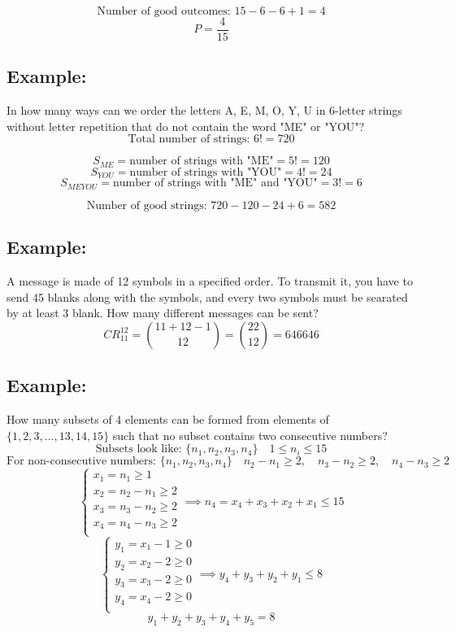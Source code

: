 \documentclass[11pt]{article}
\begin{document}
\[
\text{Number of good outcomes: } 15 - 6 - 6 + 1 = 4
\]
\[
P = \frac{4}{15}
\]

\subsection*{Example:}
In how many ways can we order the letters A, E, M, O, Y, U in 6-letter strings without letter repetition that do not contain the word "ME" or "YOU"?
\[
\text{Total number of strings: } 6! = 720
\]

\[
S_{ME} = \text{number of strings with "ME"} = 5! = 120
\]
\[
S_{YOU} = \text{number of strings with "YOU"} = 4! = 24
\]
\[
S_{MEYOU} = \text{number of strings with "ME" and "YOU"} = 3! = 6
\]

\[
\text{Number of good strings: } 720 - 120 - 24 + 6 = 582
\]

\subsection*{Example:}
A message is made of 12 symbols in a specified order. To transmit it, you have to send 45 blanks along with the symbols, and every two symbols must be searated by at least 3 blank. How many different messages can be sent?
\[
CR_{11}^{12} = \binom{11 + 12 - 1}{12} = \binom{22}{12} = 646646
\]

\subsection*{Example:}
How many subsets of 4 elements can be formed from elements of $\{1, 2, 3, \dots, 13, 14, 15\}$ such that no subset contains two consecutive numbers?
\[
\text{Subsets look like: } \{n_1, n_2, n_3, n_4\} \quad 1 \leq n_i \leq 15
\]
\[
\text{For non-consecutive numbers: } \{n_1, n_2, n_3, n_4\} \quad n_2 - n_1 \geq 2, \quad n_3 - n_2 \geq 2, \quad n_4 - n_3 \geq 2
\]
\[
\begin{cases}
    x_1 = n_1 \geq 1 \\
    x_2 = n_2 - n_1 \geq 2 \\
    x_3 = n_3 - n_2 \geq 2 \\
    x_4 = n_4 - n_3 \geq 2 \\
\end{cases} \implies 
n_4 = x_4 + x_3 + x_2 + x_1 \leq 15
\]
\[
\begin{cases}
    y_1 = x_1 - 1 \geq 0 \\
    y_2 = x_2 - 2 \geq 0 \\
    y_3 = x_3 - 2 \geq 0 \\
    y_4 = x_4 - 2 \geq 0 \\
\end{cases} \implies
y_4 + y_3 + y_2 + y_1 \leq 8
\]
\[
y_1 + y_2 + y_3 + y_4 + y_5 = 8
\]
\end{document}
